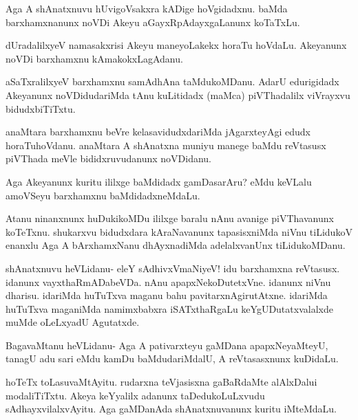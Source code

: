 \documentclass{article}
\begin{document}
\begin{mng}%
Aga A shAnatxnuvu hUvigoVsakxra kADige hoVgidadxnu. baMda
barxhamxnanunx noVDi Akeyu aGayxRpAdayxgaLanunx koTaTxLu.
\end{mng}

\begin{mng}%
dUradalilxyeV namasakxrisi Akeyu maneyoLakekx horaTu
hoVdaLu. Akeyanunx noVDi barxhamxnu kAmakokxLagAdanu.
\end{mng}

\begin{mng}%
aSaTxralilxyeV barxhamxnu samAdhAna taMdukoMDanu. AdarU
edurigidadx Akeyanunx noVDidudariMda tAnu kuLitidadx (maMca) piVThadalilx
viVrayxvu bidudxbiTiTxtu.
\end{mng}

\begin{mng}%
anaMtara barxhamxnu beVre kelasavidudxdariMda jAgarxteyAgi edudx
horaTuhoVdanu. anaMtara A shAnatxna muniyu manege baMdu reVtasusx
piVThada meVle bididxruvudanunx noVDidanu.
\end{mng}

\begin{mng}%
Aga Akeyanunx kuritu ililxge baMdidadx gamDasarAru? eMdu
keVLalu amoVSeyu barxhamxnu baMdidadxneMdaLu.
\end{mng}

\begin{mng}%
Atanu ninanxnunx huDukikoMDu ililxge baralu nAnu avanige
piVThavanunx koTeTxnu. shukarxvu bidudxdara kAraNavanunx tapasisxniMda niVnu
tiLidukoV enanxlu Aga A bArxhamxNanu dhAyxnadiMda adelalxvanUnx tiLidukoMDanu.
\end{mng}

\begin{mng}%
shAnatxnuvu heVLidanu- eleY sAdhivxVmaNiyeV! idu barxhamxna
reVtasusx. idanunx vayxthaRmADabeVDa. nAnu apapxNekoDutetxVne. idanunx
niVnu dharisu. idariMda huTuTxva maganu bahu pavitarxnAgirutAtxne. idariMda
huTuTxva maganiMda namimxbabxra iSATxthaRgaLu keYgUDutatxvalalxde muMde
oLeLxyadU Agutatxde.
\end{mng}

\begin{mng}%
BagavaMtanu heVLidanu- Aga A pativarxteyu gaMDana apapxNeyaMteyU,
tanagU adu sari eMdu kamDu baMdudariMdalU, A reVtasasxnunx
kuDidaLu.
\end{mng}

\begin{mng}%
hoTeTx toLasuvaMtAyitu. rudarxna teVjasisxna gaBaRdaMte
alAlxDalui modaliTiTxtu. Akeya keYyalilx adanunx taDedukoLuLxvudu
sAdhayxvilalxvAyitu. Aga gaMDanAda shAnatxnuvanunx kuritu iMteMdaLu.
\end{mng}
\end{document}
